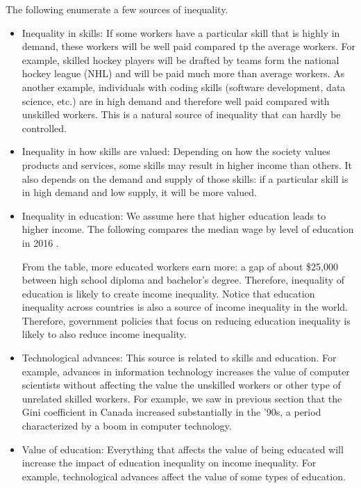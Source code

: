 \documentclass[letterpaper]{article}\usepackage[]{graphicx}\usepackage[]{color}
\numberwithin{exer}{section}
\theoremstyle{nonumberplain}
\begin{document}
The following enumerate a few sources of inequality. 
\begin{itemize}
\item Inequality in skills: If some workers have a particular skill
  that is highly in demand, these workers will be well paid compared
  tp the average workers. For example, skilled hockey players will be
  drafted by teams form the national hockey league (NHL) and will be
  paid much more than average workers. As another example, individuals
  with coding skills (software development, data science, etc.) are in
  high demand and therefore well paid compared with unskilled workers.
  This is a natural source of inequality that can hardly be
  controlled.
\item Inequality in how skills are valued: Depending on how the
  society values products and services, some skills may result in
  higher income than others. It also depends on the demand and supply
  of those skills: if a particular skill is in high demand and low
  supply, it will be more valued. 
\item Inequality in education: We assume here that higher education
  leads to higher income. The following compares the median wage by
  level of education in 2016 \citep*{educ-wage}.
\begin{center}  
\end{center}
From the table, more educated workers earn more: a gap of about
\$25,000 between high school diploma and bachelor's degree. Therefore,
inequality of education is likely to create income inequality. Notice
that education inequality across countries is also a source of income
inequality in the world. Therefore, government policies that focus on
reducing education inequality is likely to also reduce income
inequality.
\item Technological advances: This source is related to skills and
  education. For example, advances in information technology increases
  the value of computer scientists without affecting the value the
  unskilled workers or other type of unrelated skilled workers. For
  example, we saw in previous section that the Gini coefficient in
  Canada increased substantially in the '90s, a period characterized
  by a boom in computer technology.
\item Value of education: Everything that affects the value of being
  educated will increase the impact of education inequality on income
  inequality. For example, technological advances affect the value of
  some types of education.   
\end{itemize}
\end{document}
